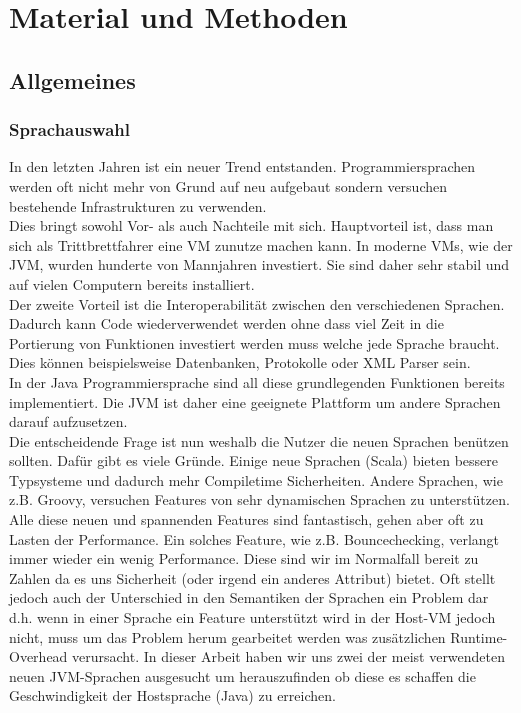 \documentclass{fancydocument}
\begin{document}
\section{Material und Methoden}

\subsection{Allgemeines}

\subsubsection{Sprachauswahl}

In den letzten Jahren ist ein neuer Trend
entstanden. Programmiersprachen werden oft nicht mehr von Grund auf neu
aufgebaut sondern versuchen bestehende Infrastrukturen zu verwenden.
\\
Dies bringt sowohl Vor- als auch Nachteile mit sich. Hauptvorteil ist, dass
man sich als Trittbrettfahrer eine VM zunutze machen kann. In moderne
VMs, wie der JVM, wurden hunderte von Mannjahren investiert. Sie sind
daher sehr stabil und auf vielen Computern bereits installiert.
\\
Der zweite Vorteil ist die Interoperabilität zwischen den
verschiedenen Sprachen. Dadurch kann Code
wiederverwendet werden ohne dass viel Zeit in die Portierung von
Funktionen investiert werden muss welche jede Sprache braucht. Dies können beispielsweise Datenbanken, Protokolle oder XML Parser sein.
\\
In der Java Programmiersprache sind all diese grundlegenden Funktionen
bereits implementiert. Die JVM ist daher eine geeignete Plattform um andere
Sprachen darauf aufzusetzen.
\\
Die entscheidende Frage ist nun weshalb die Nutzer die neuen
Sprachen ben\"utzen sollten. Dafür gibt es viele Gründe. Einige neue
Sprachen (Scala) bieten bessere Typsysteme und dadurch mehr
Compiletime Sicherheiten. Andere Sprachen, wie z.B. Groovy, versuchen Features
von sehr dynamischen Sprachen zu unterst\"utzen.
\\
Alle diese neuen und spannenden Features sind fantastisch, gehen aber
oft zu Lasten der Performance. Ein solches Feature, wie z.B.
Bouncechecking, verlangt immer wieder ein wenig Performance. Diese
sind wir im Normalfall bereit zu Zahlen da es uns Sicherheit (oder
irgend ein anderes Attribut) bietet. Oft stellt jedoch auch
der Unterschied in den Semantiken der Sprachen ein Problem
dar d.h. wenn in einer Sprache ein Feature unterst\"utzt wird in der
Host-VM jedoch nicht, muss um das Problem herum gearbeitet werden was
zus\"atzlichen Runtime-Overhead verursacht. In dieser Arbeit haben wir
uns zwei der meist verwendeten neuen JVM-Sprachen ausgesucht um
herauszufinden ob diese es schaffen die Geschwindigkeit der
Hostsprache (Java) zu erreichen.
\end{document}
